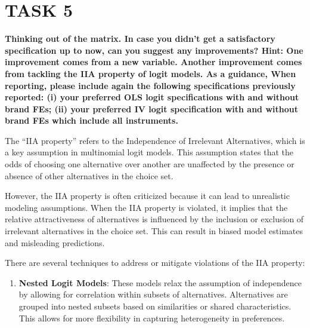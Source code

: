 \documentclass[
]{article}
\providecommand{\tightlist}{%
  \setlength{\itemsep}{0pt}\setlength{\parskip}{0pt}}
\begin{document}
\section{TASK 5}\label{task-5}

\textbf{Thinking out of the matrix. In case you didn't get a
satisfactory specification up to now, can you suggest any improvements?
Hint: One improvement comes from a new variable. Another improvement
comes from tackling the IIA property of logit models. As a guidance,
When reporting, please include again the following specifications
previously reported: (i) your preferred OLS logit specifications with
and without brand FEs; (ii) your preferred IV logit specification with
and without brand FEs which include all instruments.}

The ``IIA property'' refers to the Independence of Irrelevant
Alternatives, which is a key assumption in multinomial logit models.
This assumption states that the odds of choosing one alternative over
another are unaffected by the presence or absence of other alternatives
in the choice set.

However, the IIA property is often criticized because it can lead to
unrealistic modeling assumptions. When the IIA property is violated, it
implies that the relative attractiveness of alternatives is influenced
by the inclusion or exclusion of irrelevant alternatives in the choice
set. This can result in biased model estimates and misleading
predictions.

There are several techniques to address or mitigate violations of the
IIA property:

\begin{enumerate}
\def\labelenumi{\arabic{enumi}.}
\tightlist
\item
  \textbf{Nested Logit Models}: These models relax the assumption of
  independence by allowing for correlation within subsets of
  alternatives. Alternatives are grouped into nested subsets based on
  similarities or shared characteristics. This allows for more
  flexibility in capturing heterogeneity in preferences.
\end{enumerate}
\end{document}
